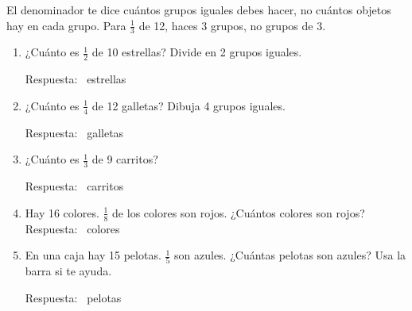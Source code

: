 \begin{wbtip}
El denominador te dice cuántos grupos iguales debes hacer, no cuántos objetos hay en cada grupo. Para $\frac{1}{3}$ de 12, haces 3 grupos, no grupos de 3.
\end{wbtip}

\begin{wbpractice}
\begin{enumerate}
\item ¿Cuánto es $\frac{1}{2}$ de 10 estrellas? Divide en 2 grupos iguales.
\begin{center}
\end{center}
\wbbox[1.5cm]
Respuesta: \wbblank\ estrellas

\item ¿Cuánto es $\frac{1}{4}$ de 12 galletas? Dibuja 4 grupos iguales.
\begin{center}
\end{center}
\wbbox[1.5cm]
Respuesta: \wbblank\ galletas

\item ¿Cuánto es $\frac{1}{3}$ de 9 carritos? 
\begin{center}
\end{center}
Respuesta: \wbblank\ carritos

\item Hay 16 colores. $\frac{1}{8}$ de los colores son rojos. ¿Cuántos colores son rojos?
\wbbox[1.5cm]
Respuesta: \wbblank\ colores

\item En una caja hay 15 pelotas. $\frac{1}{5}$ son azules. ¿Cuántas pelotas son azules? Usa la barra si te ayuda.
\begin{center}
\end{center}
Respuesta: \wbblank\ pelotas


\end{enumerate}
\end{wbpractice}
